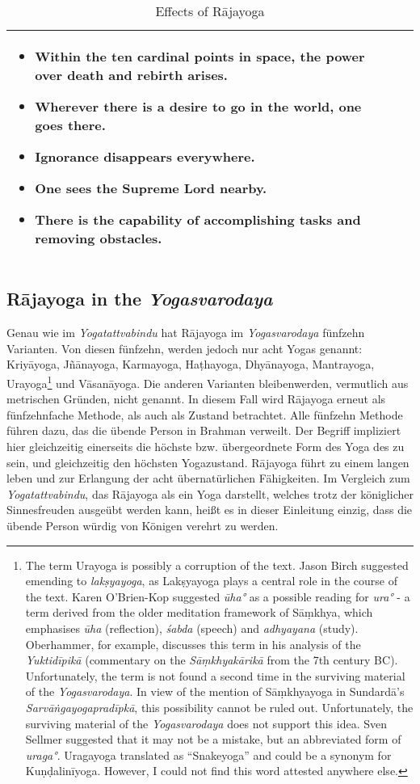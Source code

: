 \begin{table}[H]
\begin{tabular}{|p{3cm}|p{4cm}|p{4cm}|}
\begin{itemize}
    \item Within the ten cardinal points in space, the power over death and rebirth arises.
    \item Wherever there is a desire to go in the world, one goes there.
    \item Ignorance disappears everywhere.
    \item One sees the Supreme Lord nearby.
    \item There is the capability of accomplishing tasks and removing obstacles.
\end{itemize} \\
\hline
\end{tabular}
\caption{Effects of Rājayoga}
\end{table}
\newpage 
\subsection{Rājayoga in the \textit{Yogasvarodaya}}

Genau wie im \emph{Yogatattvabindu} hat Rājayoga im \emph{Yogasvarodaya} fünfzehn Varianten. Von diesen fünfzehn, werden jedoch nur acht Yogas genannt: Kriyāyoga, Jñānayoga, Karmayoga, Haṭhayoga, Dhyānayoga, Mantrayoga, Urayoga\footnote{The term Urayoga is possibly a corruption of the text. Jason Birch suggested emending to \textit{lakṣyayoga}, as Lakṣyayoga plays a central role in the course of the text. Karen O'Brien-Kop suggested \textit{ūha°} as a possible reading for \textit{ura°} - a term derived from the older meditation framework of Sāṃkhya, which emphasises \textit{ūha} (reflection), \textit{śabda} (speech) and \textit{adhyayana} (study). Oberhammer, for example, discusses this term in his analysis of the \emph{Yuktidīpikā} (commentary on the \emph{Sāṃkhyakārikā} from the 7th century BC). Unfortunately, the term is not found a second time in the surviving material of the \emph{Yogasvarodaya}. In view of the mention of Sāṃkhyayoga in Sundardā's \textit{Sarvāṅgayogapradīpkā}, this possibility cannot be ruled out. Unfortunately, the surviving material of the \textit{Yogasvarodaya} does not support this idea. Sven Sellmer suggested that it may not be a mistake, but an abbreviated form of \textit{uraga°}. Uragayoga translated as ``Snakeyoga'' and could be a synonym for Kuṇḍalinīyoga. However, I could not find this word attested anywhere else.} und Vāsanāyoga. Die anderen Varianten bleibenwerden, vermutlich aus metrischen Gründen, nicht genannt. In diesem Fall wird Rājayoga erneut als fünfzehnfache Methode, als auch als Zustand betrachtet. Alle fünfzehn Methode führen dazu, das die übende Person in Brahman verweilt. Der Begriff impliziert hier gleichzeitig einerseits die höchste bzw. übergeordnete Form des Yoga des zu sein, und gleichzeitig den höchsten Yogazustand. Rājayoga führt zu einem langen leben und zur Erlangung der acht übernatürlichen Fähigkeiten. Im Vergleich zum \emph{Yogatattvabindu}, das Rājayoga als ein Yoga darstellt, welches trotz der königlicher Sinnesfreuden ausgeübt werden kann, heißt es in dieser Einleitung einzig, dass die übende Person würdig von Königen verehrt zu werden.

